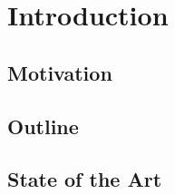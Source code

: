 \chapter{Introduction}
\label{chap:\currfilebase}

\section{Motivation}
\label{sec:motivation}

\section{Outline}
\label{sec:outline}

\section{State of the Art}
\label{sec:state_of_art}




